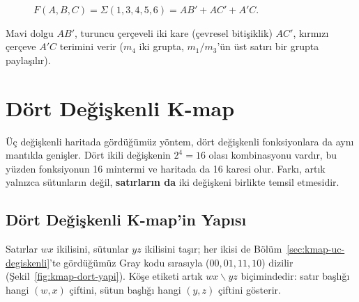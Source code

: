 \begin{figure}[H]
\centering
{}
\caption{$F(A,B,C)=\Sigma(1,3,4,5,6)=AB'+AC'+A'C$.}
\label{fig:kmap-alistirma4}
\end{figure}
Mavi dolgu $AB'$, turuncu çerçeveli iki kare (çevresel bitişiklik) $AC'$, kırmızı çerçeve
$A'C$ terimini verir ($m_4$ iki grupta, $m_1/m_3$'ün üst satırı bir grupta paylaşılır).

\section{Dört Değişkenli K-map}\label{sec:kmap-dort-degiskenli}
Üç değişkenli haritada gördüğümüz yöntem, dört değişkenli fonksiyonlara da aynı mantıkla
genişler. Dört ikili değişkenin $2^4=16$ olası kombinasyonu vardır, bu yüzden fonksiyonun
16 mintermi ve haritada da 16 karesi olur. Farkı, artık yalnızca sütunların değil,
\textbf{satırların da} iki değişkeni birlikte temsil etmesidir.

\subsection{Dört Değişkenli K-map'in Yapısı}\label{sec:kmap-dort-yapi}
Satırlar $wx$ ikilisini, sütunlar $yz$ ikilisini taşır; her ikisi de Bölüm~\ref{sec:kmap-uc-degiskenli}'te
gördüğümüz Gray kodu sırasıyla ($00,01,11,10$) dizilir (Şekil~\ref{fig:kmap-dort-yapi}).
Köşe etiketi artık $wx\backslash yz$ biçimindedir: satır başlığı hangi $(w,x)$ çiftini,
sütun başlığı hangi $(y,z)$ çiftini gösterir.

